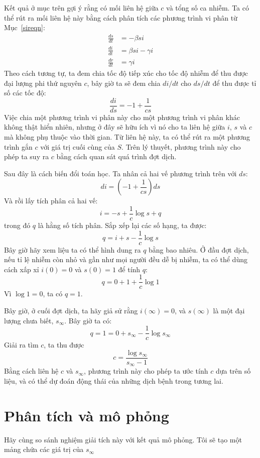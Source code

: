 \documentclass[12pt, openany]{book}
\theoremstyle{exercise}
\begin{document}
Kết quả ở mục trên gợi ý rằng có mối liên hệ giữa $c$ và tổng số ca nhiễm. Ta có thể rút ra mối liên hệ này bằng cách phân tích các phương trình vi phân từ Mục~\ref{sireqn}:
%
\begin{align*}
\frac{ds}{dt} &= -\beta s i \\
\frac{di}{dt} &= \beta s i - \gamma i\\
\frac{dr}{dt} &= \gamma i
\end{align*}
%
Theo cách tương tự, ta đem chia tốc độ tiếp xúc cho tốc độ nhiễm để thu được đại lượng phi thứ nguyên $c$, bây giờ ta sẽ đem chia $di/dt$ cho $ds/dt$ để thu được tỉ số các tốc độ:
%
\[ \frac{di}{ds} = -1 + \frac{1}{cs} \]
%
Việc chia một phương trình vi phân này cho một phương trình vi phân khác không thật hiển nhiên, nhưng ở đây sẽ hữu ích vì nó cho ta liên hệ giữa $i$, $s$ và $c$ mà không phụ thuộc vào thời gian. Từ liên hệ này, ta có thể rút ra một phương trình gắn $c$ với giá trị cuối cùng của $S$.  Trên lý thuyết, phương trình này cho phép ta suy ra $c$ bằng cách quan sát quá trình đợt dịch.

Sau đây là cách biến đổi toán học. Ta nhân cả hai vế phương trình trên với $ds$:
%
\[ di = \left( -1 + \frac{1}{cs} \right) ds \]
%
Và rồi lấy tích phân cả hai vế:
%
\[ i = -s + \frac{1}{c} \log s + q \]
%
trong đó $q$ là hằng số tích phân. Sắp xếp lại các số hạng, ta được:
%
\[ q = i + s - \frac{1}{c} \log s \]
%
Bây giờ hãy xem liệu ta có thể hình dung ra $q$ bằng bao nhiêu. Ở đầu đợt dịch, nếu tỉ lệ nhiễm còn nhỏ và gần như mọi người đều dễ bị nhiễm, ta có thể dùng cách xấp xỉ $i(0) = 0$ và $s(0) = 1$ để tính $q$:
%
\[ q = 0 + 1 + \frac{1}{c} \log 1 \]
%
Vì $\log 1 = 0$, ta có $q = 1$.

\newcommand{\sinf}{s_{\infty}}

Bây giờ, ở cuối đợt dịch, ta hãy giả sử rằng $i(\infty) = 0$, và $s(\infty)$ là một đại lượng chưa biết, $\sinf$.  Bây giờ ta có:
%
\[ q = 1 = 0 + \sinf - \frac{1}{c} \log \sinf \]
%
Giải ra tìm $c$, ta thu được
%
\[ c = \frac{\log \sinf}{\sinf - 1} \]
%
Bằng cách liên hệ $c$ và $\sinf$, phương trình này cho phép ta ước tính $c$ dựa trên số liệu, và có thể dự đoán động thái của những dịch bệnh trong tương lai.

\section{Phân tích và mô phỏng}

Hãy cùng so sánh nghiệm giải tích này với kết quả mô phỏng.
Tôi sẽ tạo một mảng chứa các giá trị của $\sinf$
\end{document}
